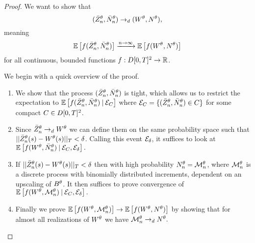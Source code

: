 \begin{proof}



We want to show that
\begin{equation}
(\bar{Z}^{\theta}_n, \bar{N}_n^{\theta}) \rightarrow_d (W^{\theta}, N^{\theta}),
\end{equation}
meaning 
\begin{equation}
\mathbb{E} \left[ f(\bar{Z}^{\theta}_n, \bar{N}_n^{\theta}) \right] \xrightarrow{n \rightarrow \infty} \mathbb{E} \left[ f(W^{\theta}, N^{\theta}) \right]
\end{equation}
for all continuous, bounded functions $f:D[0,T]^2\rightarrow\mathbb{R}$.

We begin with a quick overview of the proof.
\begin{enumerate}
	\item We show that the process $(\bar{Z}^{\theta}_n, \bar{N}_n^{\theta})$ is tight,
	which allows us to restrict the expectation to
	\begin{math}
		\mathbb{E} \left[ f(\bar{Z}^{\theta}_n, \bar{N}_n^{\theta}) \: | \: \mathcal{E}_{C} \right]
	\end{math}
	where
	\begin{math}
		\mathcal{E}_{C} = \{ (\bar{Z}^{\theta}_n, \bar{N}_n^{\theta}) \in C \}
	\end{math}
	for some compact $C \in D[0, T]^2$.
	
	\item Since $\bar{Z}^{\theta}_n \rightarrow_d W^{\theta}$ we can define them on the same probability space such that
	$||\bar{Z}^{\theta}_n(s) - W^{\theta}(s)||_T < \delta$. 
	Calling this event $\mathcal{E}_{\delta}$,
	it suffices to look at
	\begin{math}
	\mathbb{E} \left[ f(W^{\theta}, \bar{N}_n^{\theta}) \: | \: \mathcal{E}_{C}, \mathcal{E}_{\delta} \right].
	\end{math}
	
	\item If $||\bar{Z}^{\theta}_n(s) - W^{\theta}(s)||_T < \delta$ then with high probability $N_n^{\theta} = \mathcal{M}_n^{\theta}$,
	where $\mathcal{M}_n^{\theta}$ is a discrete process with binomially distributed increments,
	dependent on an upscaling of $B^{\theta}$.
	It then suffices to prove convergence of 
	\begin{math}
		\mathbb{E} \left[ f(W^{\theta}, \mathcal{M}_n^{\theta}) \: | \: \mathcal{E}_{C}, \mathcal{E}_{\delta} \right].
	\end{math}	
	
	\item Finally we prove
	\begin{math}
		\mathbb{E} \left[ f(W^{\theta}, \mathcal{M}_n^{\theta}) \right] \rightarrow \mathbb{E} \left[ f(W^{\theta}, N^{\theta}) \right]
	\end{math}
	by showing that for almost all realizations of $W^{\theta}$ we have
	\begin{math}
		\mathcal{M}_n^{\theta} \rightarrow_d N^{\theta}.
	\end{math}
\end{enumerate}



\end{proof}
